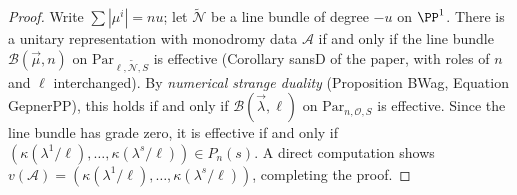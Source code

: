 \begin{proof}
  Write \(\sum |\mu^i| = nu\); let \(\widetilde{\mathcal{N}}\) be a line bundle of degree \(-u\) on \(\PP^1\). There is a unitary representation with monodromy data \(\mathcal{A}\) if and only if the line bundle \(\mathcal{B}(\vec{\mu}, n)\) on \(\mathrm{Par}_{\ell, \widetilde{\mathcal{N}}, S}\) is effective (Corollary sansD of the paper, with roles of \(n\) and \(\ell\) interchanged). By \emph{numerical strange duality} (Proposition BWag, Equation GepnerPP), this holds if and only if \(\mathcal{B}(\vec{\lambda}, \ell)\) on \(\mathrm{Par}_{n, \mathcal{O}, S}\) is effective. Since the line bundle has grade zero, it is effective if and only if \((\kappa(\lambda^1/\ell), \ldots, \kappa(\lambda^s/\ell)) \in P_n(s)\). A direct computation shows \(v(\mathcal{A}) = (\kappa(\lambda^1/\ell), \ldots, \kappa(\lambda^s/\ell))\), completing the proof.
\end{proof}

